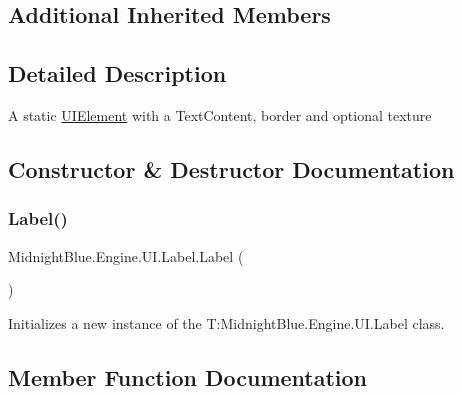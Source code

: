 \subsection*{Additional Inherited Members}


\subsection{Detailed Description}
A static \hyperlink{class_midnight_blue_1_1_engine_1_1_u_i_1_1_u_i_element}{U\+I\+Element} with a Text\+Content, border and optional texture 



\subsection{Constructor \& Destructor Documentation}
\hypertarget{class_midnight_blue_1_1_engine_1_1_u_i_1_1_label_a0a642b3876e1c7b0a6113d0aa4046472}{}\label{class_midnight_blue_1_1_engine_1_1_u_i_1_1_label_a0a642b3876e1c7b0a6113d0aa4046472} 
\subsubsection{\texorpdfstring{Label()}{Label()}}
{\footnotesize\ttfamily Midnight\+Blue.\+Engine.\+U\+I.\+Label.\+Label (\begin{DoxyParamCaption}{ }\end{DoxyParamCaption})\hspace{0.3cm}{\ttfamily [inline]}}



Initializes a new instance of the T\+:\+Midnight\+Blue.\+Engine.\+U\+I.\+Label class. 



\subsection{Member Function Documentation}
\hypertarget{class_midnight_blue_1_1_engine_1_1_u_i_1_1_label_a9ec463bec9d804cd92ec889b002619f6}{}\label{class_midnight_blue_1_1_engine_1_1_u_i_1_1_label_a9ec463bec9d804cd92ec889b002619f6} 
